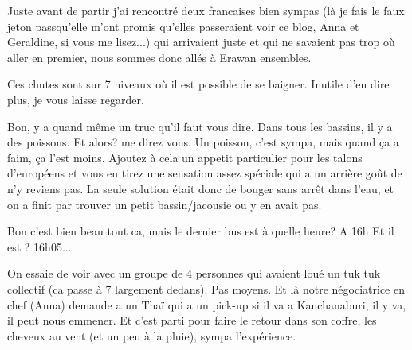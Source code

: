 \begin{multicols}{2}
Juste avant de partir j'ai rencontré deux francaises bien sympas (là je fais le faux jeton passqu'elle m'ont promis qu'elles passeraient voir ce blog, Anna et Geraldine, si vous me lisez...) qui arrivaient juste et qui ne savaient pas trop où aller en premier, nous sommes donc allés à Erawan ensembles.

Ces chutes sont sur 7 niveaux où il est possible de se baigner. Inutile d'en dire plus, je vous laisse regarder.





Bon, y a quand même un truc qu'il faut vous dire. Dans tous les bassins, il y a des poissons. Et alors? me direz vous. Un poisson, c'est sympa, mais quand ça a faim, ça l'est moins. Ajoutez à cela un appetit particulier pour les talons d'européens et vous en tirez une sensation assez spéciale qui a un arrière goût de n'y reviens pas. La seule solution était donc de bouger sans arrêt dans l'eau, et on a finit par trouver un petit bassin/jacousie ou y en avait pas.

\begin{dialogue}
   Bon c'est bien beau tout ca, mais le dernier bus est à quelle heure?
   A 16h
   Et il est ?
   16h05...
\end{dialogue}

On essaie de voir avec un groupe de 4 personnes qui avaient loué un tuk tuk collectif (ca passe à 7 largement dedans). Pas moyens. Et là notre négociatrice en chef (Anna) demande a un Thaï qui a un pick-up si il va a Kanchanaburi, il y va, il peut nous emmener. Et c'est parti pour faire le retour dans son coffre, les cheveux au vent (et un peu à la pluie), sympa l'expérience.


\end{multicols}
